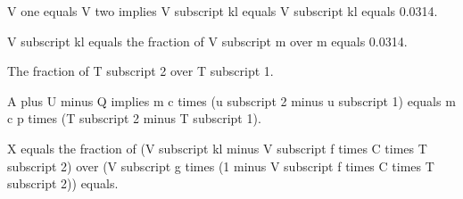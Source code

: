 V one equals V two implies V subscript kl equals V subscript kl equals 0.0314.

V subscript kl equals the fraction of V subscript m over m equals 0.0314.

The fraction of T subscript 2 over T subscript 1.

A plus U minus Q implies m c times (u subscript 2 minus u subscript 1) equals m c p times (T subscript 2 minus T subscript 1).

X equals the fraction of (V subscript kl minus V subscript f times C times T subscript 2) over (V subscript g times (1 minus V subscript f times C times T subscript 2)) equals.